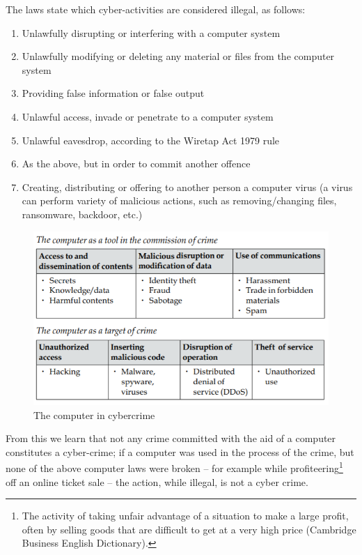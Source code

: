 The laws state which cyber-activities are considered illegal, as follows:
\begin{enumerate}
    \item Unlawfully disrupting or interfering with a computer system
    \item Unlawfully modifying or deleting any material or files from the computer system
    \item Providing false information or false output
    \item Unlawful access, invade or penetrate to a computer system
    \item Unlawful eavesdrop, according to the Wiretap Act 1979 rule
    \item As the above, but in order to commit another offence
    \item Creating, distributing or offering to another person a computer virus (a virus can perform variety of malicious actions, such as removing/changing files, ransomware, backdoor, etc.)
\end{enumerate}

\begin{figure}[!ht]
    \centering
    \includegraphics[width=\textwidth]{images/chapter10/computer_in_cyber_crimes.png}
    \caption{The computer in cybercrime \cite{tabansky2012cybercrime}} \label{fig:comp_in_cybercrime}
\end{figure}

From this we learn that not any crime committed with the aid of a computer
constitutes a cyber-crime; if a computer was used in the process of the crime,
but none of the above computer laws were broken -- for example while
profiteering\footnote{The activity of taking unfair advantage of a situation to make a large profit, 
often by selling goods that are difficult to get at a very high price (Cambridge Business English Dictionary).} 
off an online ticket sale -- the action, while illegal, is not a cyber
crime.


